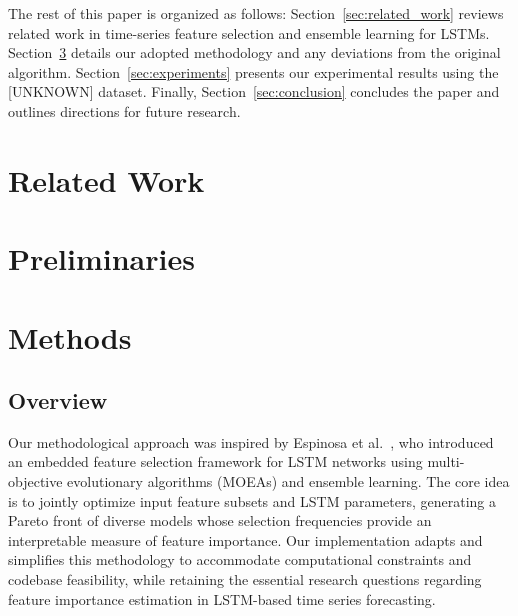 \documentclass[12pt]{article}
\begin{document}
The rest of this paper is organized as follows: Section~\ref{sec:related_work} reviews related work in time-series feature selection and ensemble learning for LSTMs. Section~\ref{sec:methods} details our adopted methodology and any deviations from the original algorithm. Section~\ref{sec:experiments} presents our experimental results using the [UNKNOWN] dataset. Finally, Section~\ref{sec:conclusion} concludes the paper and outlines directions for future research.



\section{Related Work}

\section{Preliminaries}

 
\section{Methods}
\label{sec:methods}

\subsection{Overview}

Our methodological approach was inspired by Espinosa et al.~\cite{espinosa2023efs}, who introduced an embedded feature selection framework for LSTM networks using multi-objective evolutionary algorithms (MOEAs) and ensemble learning. The core idea is to jointly optimize input feature subsets and LSTM parameters, generating a Pareto front of diverse models whose selection frequencies provide an interpretable measure of feature importance. Our implementation adapts and simplifies this methodology to accommodate computational constraints and codebase feasibility, while retaining the essential research questions regarding feature importance estimation in LSTM-based time series forecasting.
\end{document}
